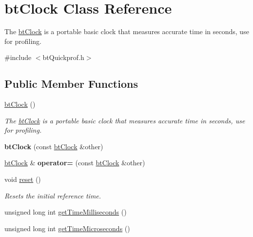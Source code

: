 \hypertarget{classbt_clock}{\section{bt\+Clock Class Reference}
\label{classbt_clock}
}


The \hyperlink{classbt_clock}{bt\+Clock} is a portable basic clock that measures accurate time in seconds, use for profiling.  




{\ttfamily \#include $<$bt\+Quickprof.\+h$>$}

\subsection*{Public Member Functions}
\begin{DoxyCompactItemize}
\item 
\hypertarget{classbt_clock_ac169d73599151d07b6449505d7c66738}{\hyperlink{classbt_clock_ac169d73599151d07b6449505d7c66738}{bt\+Clock} ()}\label{classbt_clock_ac169d73599151d07b6449505d7c66738}

\begin{DoxyCompactList}\small\item\em The \hyperlink{classbt_clock}{bt\+Clock} is a portable basic clock that measures accurate time in seconds, use for profiling. \end{DoxyCompactList}\item 
\hypertarget{classbt_clock_a16cbad5225f0d2ab96e18e7e9b864ca6}{{\bfseries bt\+Clock} (const \hyperlink{classbt_clock}{bt\+Clock} \&other)}\label{classbt_clock_a16cbad5225f0d2ab96e18e7e9b864ca6}

\item 
\hypertarget{classbt_clock_ac3f55e1187c51b9ad6827b53243db170}{\hyperlink{classbt_clock}{bt\+Clock} \& {\bfseries operator=} (const \hyperlink{classbt_clock}{bt\+Clock} \&other)}\label{classbt_clock_ac3f55e1187c51b9ad6827b53243db170}

\item 
\hypertarget{classbt_clock_a592eb764c2e7b645c9619ab7e483166c}{void \hyperlink{classbt_clock_a592eb764c2e7b645c9619ab7e483166c}{reset} ()}\label{classbt_clock_a592eb764c2e7b645c9619ab7e483166c}

\begin{DoxyCompactList}\small\item\em Resets the initial reference time. \end{DoxyCompactList}\item 
unsigned long int \hyperlink{classbt_clock_ae2c3da98828b79c1966c47c20b45b32f}{get\+Time\+Milliseconds} ()
\item 
unsigned long int \hyperlink{classbt_clock_a94dd567e0fb67862832446c884f1a223}{get\+Time\+Microseconds} ()
\end{DoxyCompactItemize}


